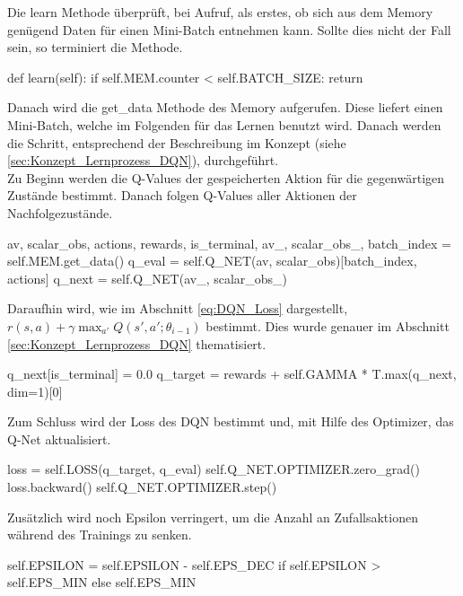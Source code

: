 Die learn Methode überprüft, bei Aufruf, als erstes, ob sich aus dem Memory genügend Daten für einen Mini-Batch entnehmen kann. Sollte dies nicht der Fall sein, so terminiert die Methode.
\begin{python}
	def learn(self):
		if self.MEM.counter < self.BATCH_SIZE:
			return
\end{python}
Danach wird die get\_data Methode des Memory aufgerufen. Diese liefert einen Mini-Batch, welche im Folgenden für das Lernen benutzt wird. Danach werden die Schritt, entsprechend der Beschreibung im Konzept (siehe \ref{sec:Konzept_Lernprozess_DQN}), durchgeführt.\\
Zu Beginn werden die Q-Values der gespeicherten Aktion für die gegenwärtigen Zustände bestimmt. Danach folgen Q-Values aller Aktionen der Nachfolgezustände.
\begin{python}
	av, scalar_obs, actions, rewards, is_terminal, av_, scalar_obs_, batch_index = self.MEM.get_data()
	q_eval = self.Q_NET(av, scalar_obs)[batch_index, actions]
	q_next = self.Q_NET(av_, scalar_obs_)
\end{python}
Daraufhin wird, wie im Abschnitt \ref{eq:DQN_Loss} dargestellt, $r(s,a) +\gamma \max_{a'}Q(s',a';\theta_{i-1})$ bestimmt. Dies wurde genauer im Abschnitt \ref{sec:Konzept_Lernprozess_DQN} thematisiert.
\begin{python}
	q_next[is_terminal] = 0.0
	q_target = rewards + self.GAMMA * T.max(q_next, dim=1)[0]
\end{python}
Zum Schluss wird der Loss des DQN bestimmt und, mit Hilfe des Optimizer, das Q-Net aktualisiert.
\begin{python}
	loss = self.LOSS(q_target, q_eval)
	self.Q_NET.OPTIMIZER.zero_grad()
	loss.backward()
	self.Q_NET.OPTIMIZER.step()
\end{python}
Zusätzlich wird noch Epsilon verringert, um die Anzahl an Zufallsaktionen während des Trainings zu senken.
\begin{python}
	self.EPSILON = self.EPSILON - self.EPS_DEC if self.EPSILON > self.EPS_MIN else self.EPS_MIN
\end{python}

